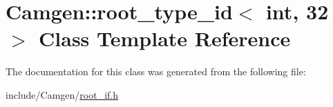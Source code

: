 \hypertarget{a00488}{}\section{Camgen\+:\+:root\+\_\+type\+\_\+id$<$ int, 32 $>$ Class Template Reference}
\label{a00488}


The documentation for this class was generated from the following file\+:\begin{DoxyCompactItemize}
\item 
include/\+Camgen/\hyperlink{a00760}{root\+\_\+if.\+h}\end{DoxyCompactItemize}
